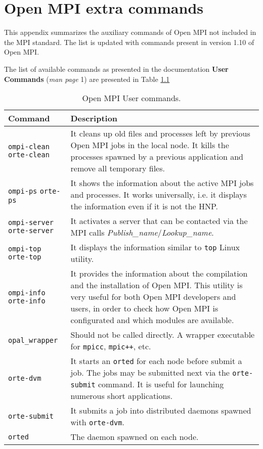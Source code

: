 \chapter{Open MPI extra commands}
\label{app:ompicommands}
This appendix summarizes the auxiliary commands of Open MPI not included in the
MPI standard. The list is updated with commands present in version 1.10 of Open
MPI.

The list of available commands as presented in the documentation 
\textbf{User Commands} (\emph{man page} 1) are presented in Table
\ref{tab:ompi-cmd-1}

\begin{table}[h]
\centering
\begin{tabular}{p{3cm}|p{9cm}}

\textbf{Command} & \textbf{Description} \\ \hline
\texttt{ompi-clean}
\texttt{orte-clean} & It cleans up old files and processes left by previous Open
                      MPI jobs in the local node. It kills the processes spawned
                      by a previous application and remove all temporary files.
\\ \hline 
\texttt{ompi-ps} 
\texttt{orte-ps}    & It shows the information about the active MPI jobs and
                      processes. It works universally, i.e. it displays the
                      information even if it is not the HNP.
\\ \hline
\texttt{ompi-server}
\texttt{orte-server}& It activates a server that can be contacted via the MPI
                      calls \emph{Publish\_name}/\emph{Lookup\_name}.
\\ \hline
\texttt{ompi-top}
\texttt{orte-top}   & It displays the information similar to \texttt{top} Linux
                      utility.
\\ \hline
\texttt{ompi-info}
\texttt{orte-info}  & It provides the information about the compilation and the
                      installation of Open MPI. This utility is very useful for
                      both Open MPI developers and users, in order to check
                      how Open MPI is configurated and which modules are
                      available.
\\ \hline
\texttt{opal\_wrapper} & Should not be called directly. A wrapper executable for
                        \texttt{mpicc}, \texttt{mpic++}, etc. 

\\ \hline
\texttt{orte-dvm} & It starts an \texttt{orted} for each node before submit a
                    job. The jobs may be submitted next via the 
                    \texttt{orte-submit} command. It is useful for launching
                    numerous short applications. 

\\ \hline
\texttt{orte-submit} & It submits a job into distributed daemons spawned with
                       \texttt{orte-dvm}. 

\\ \hline
\texttt{orted}       & The daemon spawned on each node.
\end{tabular}

\caption{Open MPI User commands.}
\label{tab:ompi-cmd-1}
\end{table}

